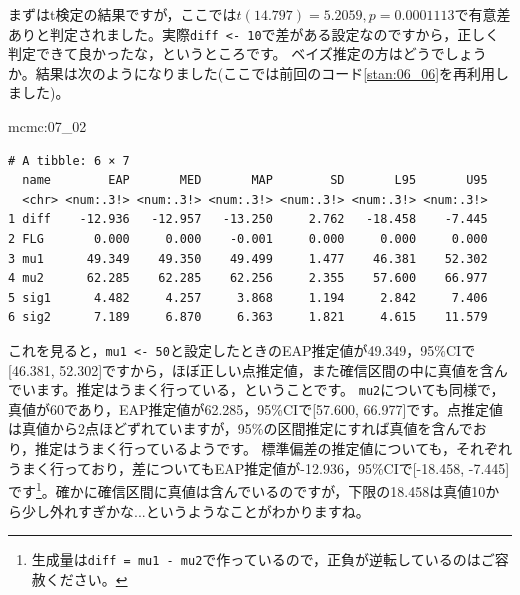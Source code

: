 \documentclass{ltjsbook}
\begin{document}
まずはt検定の結果ですが，ここでは$t(14.797)=5.2059,p=0.0001113$で有意差ありと判定されました。実際\verb|diff <- 10|で差がある設定なのですから，正しく判定できて良かったな，というところです。
ベイズ推定の方はどうでしょうか。結果は次のようになりました(ここでは前回のコード\ref{stan:06_06}を再利用しました)。
\begin{MCMCout}{}{mcmc:07_02}
	\begin{verbatim}
# A tibble: 6 × 7
  name        EAP       MED       MAP        SD       L95       U95
  <chr> <num:.3!> <num:.3!> <num:.3!> <num:.3!> <num:.3!> <num:.3!>
1 diff    -12.936   -12.957   -13.250     2.762   -18.458    -7.445
2 FLG       0.000     0.000    -0.001     0.000     0.000     0.000
3 mu1      49.349    49.350    49.499     1.477    46.381    52.302
4 mu2      62.285    62.285    62.256     2.355    57.600    66.977
5 sig1      4.482     4.257     3.868     1.194     2.842     7.406
6 sig2      7.189     6.870     6.363     1.821     4.615    11.579
\end{verbatim}
\end{MCMCout}
これを見ると，\verb|mu1 <- 50|と設定したときのEAP推定値が49.349，95\%CIで[46.381, 52.302]ですから，ほぼ正しい点推定値，また確信区間の中に真値を含んでいます。推定はうまく行っている，ということです。
\verb|mu2|についても同様で，真値が60であり，EAP推定値が62.285，95\%CIで[57.600, 66.977]です。点推定値は真値から2点ほどずれていますが，95\%の区間推定にすれば真値を含んでおり，推定はうまく行っているようです。
標準偏差の推定値についても，それぞれうまく行っており，差についてもEAP推定値が-12.936，95\%CIで[-18.458, -7.445]です\footnote{生成量は\verb|diff = mu1 - mu2|で作っているので，正負が逆転しているのはご容赦ください。}。確かに確信区間に真値は含んでいるのですが，下限の18.458は真値10から少し外れすぎかな...というようなことがわかりますね。
\end{document}
